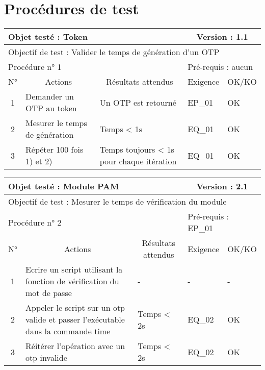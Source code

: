 \documentclass{"../../res/univ-projet"}
\begin{document}
  \section{Procédures de test}  
  \begin{center}
    \begin{tabular}{|c|p{5cm}|p{5cm}|p{1.5cm}|p{1.5cm}|}
      \hline
      \multicolumn{3}{|l|}{Objet testé : Token} & \multicolumn{2}{c|}{Version : 1.1}\\ \hline
      \multicolumn{5}{|l|}{Objectif de test : Valider le temps de génération d'un OTP}\\ \hline
      \multicolumn{3}{|l|}{Procédure n° 1} & \multicolumn{2}{p{3cm}|}{Pré-requis : aucun}\\ \hline
      \multicolumn{1}{|c|}{N°} & \multicolumn{1}{c|}{Actions} & \multicolumn{1}{c|}{Résultats attendus} & 
      \multicolumn{1}{c|}{Exigence} & \multicolumn{1}{c|}{OK/KO}\\ \hline
      1 & Demander un OTP au token & Un OTP est retourné & EP\_01 & OK\\
      2 & Mesurer le temps de génération & Temps < 1s & EQ\_01 & OK\\
      3 & Répéter 100 fois 1) et 2) & Temps toujours < 1s pour chaque itération & EQ\_01 & OK\\ \hline
    \end{tabular}
    \vfill
    
    \begin{tabular}{|c|p{5cm}|p{5cm}|p{1.5cm}|p{1.5cm}|}
      \hline
      \multicolumn{3}{|l|}{Objet testé : Module PAM} & \multicolumn{2}{c|}{Version : 2.1}\\ \hline
      \multicolumn{5}{|l|}{Objectif de test : Mesurer le temps de vérification du module}\\ \hline
      \multicolumn{3}{|l|}{Procédure n° 2} & \multicolumn{2}{p{3cm}|}{Pré-requis : EP\_01}\\ \hline
      \multicolumn{1}{|c|}{N°} & \multicolumn{1}{c|}{Actions} & \multicolumn{1}{c|}{Résultats attendus} & 
      \multicolumn{1}{c|}{Exigence} & \multicolumn{1}{c|}{OK/KO}\\ \hline
      1 & Ecrire un script utilisant la fonction de vérification du mot de passe & - & - & - \\ 
      2 & Appeler le script sur un otp valide et passer l'exécutable dans la commande time &
            Temps < 2s & EQ\_02 & OK \\
      3 & Réitérer l'opération avec un otp invalide & Temps < 2s & EQ\_02 & OK \\
      \hline
    \end{tabular}
    \vfill
    

\end{center}
\end{document}

